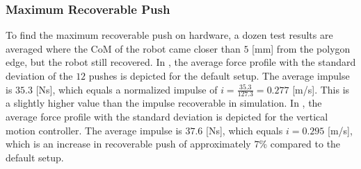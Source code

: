 \subsubsection{Maximum Recoverable Push}
To find the maximum recoverable push on hardware, a dozen test results are averaged where the \ac{CoM} of the robot came closer than $5$ [mm] from the polygon edge, but the robot still recovered. In , the average force profile with the standard deviation of the $12$ pushes is depicted for the default setup. The average impulse is $35.3$ [Ns], which equals a normalized impulse of $i=\frac{35.3}{127.3}=0.277$ [m/s]. This is a slightly higher value than the impulse recoverable in simulation. In , the average force profile with the standard deviation is depicted for the vertical motion controller. The average impulse is $37.6$ [Ns], which equals $i=0.295$ [m/s], which is an increase in recoverable push of approximately $7$\% compared to the default setup.
